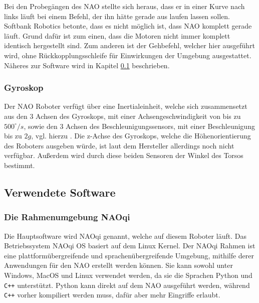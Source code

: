 Bei den Probegängen des NAO stellte sich heraus, dass er in einer Kurve nach links läuft bei einem Befehl, der ihn hätte gerade aus laufen lassen sollen. Softbank Robotics betonte, dass es nicht möglich ist, dass NAO komplett gerade läuft. Grund dafür ist zum einen, dass die Motoren nicht immer komplett identisch hergestellt sind. Zum anderen ist der Gehbefehl, welcher hier ausgeführt wird, ohne Rückkopplungsschleife für Einwirkungen der Umgebung ausgestattet. Näheres zur Software wird in Kapitel \ref{software} beschrieben.



\subsubsection*{Gyroskop}
Der NAO Roboter verfügt über eine Inertialeinheit, welche sich zusammensetzt aus den 3 Achsen des Gyroskops, mit einer Achsengeschwindigkeit von bis zu $500^\circ\unit{/s}$, sowie den 3 Achsen des Beschleunigungssensors, mit einer Beschleunigung bis zu $2\unit{g}$, vgl. hierzu \cite[/Technical overview/Inertial unit]{nao_docu_dev_guide}. Die z-Achse des Gyroskops, welche die Höhenorientierung des Roboters ausgeben würde, ist laut dem Hersteller allerdings noch nicht verfügbar. Außerdem wird durch diese beiden Sensoren der Winkel des Torsos bestimmt. 
\FloatBarrier

\subsection{Verwendete Software} \label{software}
\subsubsection*{Die Rahmenumgebung NAOqi}
Die Hauptsoftware wird NAOqi genannt, welche auf diesem Roboter läuft. Das Betriebssystem NAOqi OS basiert auf dem Linux Kernel. Der NAOqi Rahmen ist eine plattformübergreifende und sprachenübergreifende Umgebung, mithilfe derer Anwendungen für den NAO erstellt werden können. Sie kann sowohl unter Windows, MacOS und Linux verwendet werden, da sie die Sprachen Python und \texttt{C++} unterstützt. Python kann direkt auf dem NAO ausgeführt werden, während \texttt{C++} vorher kompiliert werden muss, dafür aber mehr Eingriffe erlaubt. \cite[/Former NAOqi Framework/Key concepts]{naoqi_dev_guide}

